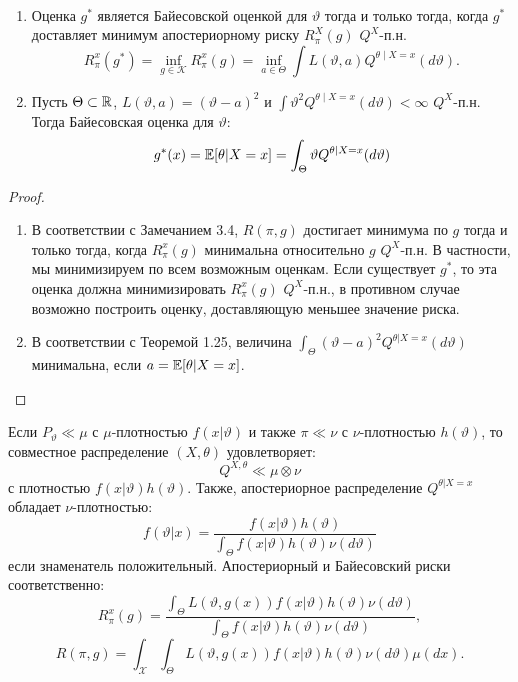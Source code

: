 \begin{thm} \label{thm3.5} \
	\begin{enumerate}
		\item Оценка $g^*$ является Байесовской оценкой для $\vartheta$ тогда и только тогда, когда $g^*$ доставляет минимум апостериорному риску $R_{\pi}^{X}(g)$ $Q^X$-п.н.
		\[R_{\pi}^x(g^*)=\inf_{g \in \mathcal{K}}R_{\pi}^x(g)=\inf_{a \in \Theta} \int L(\vartheta, a) Q^{\theta \mid X = x}(d\vartheta). \]
		\item Пусть $\Theta \subset \mathbb{R}$, $L(\vartheta, a) = (\vartheta - a)^2$ и $\int \vartheta^2 Q^{\theta \mid X = x}(d\vartheta) < \infty$ $Q^X$-п.н. Тогда Байесовская оценка для $\vartheta$:
		\[g^*(x)=\mathbb{E}[\theta | X = x] = \int_{\Theta} \vartheta Q^{\theta \mid X = x}(d\vartheta)\]
	\end{enumerate}
\end{thm}
\begin{proof}
	\begin{enumerate}
		\item В соответствии с Замечанием 3.4, $R(\pi, g)$ достигает минимума по $g$ тогда и только тогда, когда $R_{\pi}^x(g)$ минимальна относительно $g$ $Q^X$-п.н. В частности, мы минимизируем по всем возможным оценкам. Если существует $g^*$, то эта оценка должна минимизировать $R_{\pi}^x(g)$ $Q^X$-п.н., в противном случае возможно построить оценку, доставляющую меньшее значение риска.
		\item В соответствии с Теоремой 1.25, величина $\int_\Theta(\vartheta - a)^2 Q^{\theta|X=x}(d\vartheta)$ минимальна, если $a=\mathbb{E}[\theta|X=x]$.
	\end{enumerate}
\end{proof}


\begin{rmrk}
	Если $P_\vartheta \ll \mu$ с $\mu$-плотностью $f(x|\vartheta)$ и также $\pi \ll \nu$ с $\nu$-плотностью $h(\vartheta)$, то совместное распределение $(X,\theta)$ удовлетворяет:
	\[ Q^{X, \theta} \ll \mu \otimes \nu  \]
	с плотностью $f(x|\vartheta) h(\vartheta)$. Также, апостериорное распределение $Q^{\theta | X=x}$ обладает $\nu$-плотностью:
	\[ f(\vartheta | x) = \frac{f(x|\vartheta) h(\vartheta)}{\int_\Theta f(x|\vartheta) h(\vartheta) \nu (d\vartheta)}
	\]
	если знаменатель положительный. Апостериорный и Байесовский риски соответственно:
	\[ R_\pi^x(g) = \frac{\int_\Theta L(\vartheta, g(x))f(x|\vartheta) h(\vartheta) \nu (d\vartheta)}{\int_\Theta f(x|\vartheta) h(\vartheta) \nu (d\vartheta)} , \]
	\[ R(\pi, g)=\int_{\mathcal{X}}\int_\Theta L(\vartheta, g(x))f(x|\vartheta) h(\vartheta) \nu (d\vartheta) \mu(dx). \]	
\end{rmrk}

